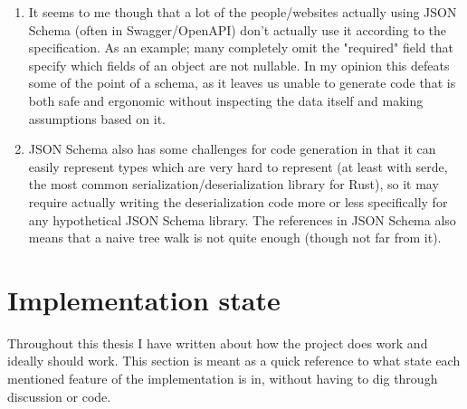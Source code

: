 \begin{enumerate}
  \item It seems to me though that a lot of the people/websites actually using JSON Schema (often in Swagger/OpenAPI) don't actually use it according to the specification. As an example; many completely omit the "required" field that specify which fields of an object are not nullable. In my opinion this defeats some of the point of a schema, as it leaves us unable to generate code that is both safe and ergonomic without inspecting the data itself and making assumptions based on it.
  \item JSON Schema also has some challenges for code generation in that it can easily represent types which are very hard to represent (at least with serde, the most common serialization/deserialization library for Rust), so it may require actually writing the deserialization code more or less specifically for any hypothetical JSON Schema library. The references in JSON Schema also means that a naive tree walk is not quite enough (though not far from it).
\end{enumerate}



\newpage
\section{Implementation state}

Throughout this thesis I have written about how the project does work and ideally should work. This section is meant as a quick reference to what state each mentioned feature of the implementation is in, without having to dig through discussion or code.


